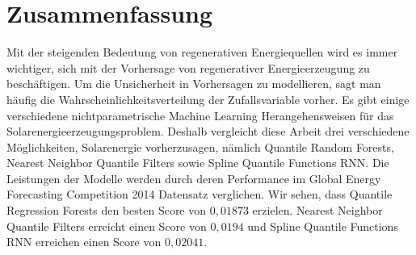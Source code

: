 
\chapter*{Zusammenfassung}

\begin{center}
  \begin{minipage}{12cm}
    \begin{sloppypar}
      Mit der steigenden Bedeutung von regenerativen Energiequellen wird es immer wichtiger, 
      sich mit der Vorhersage von regenerativer Energieerzeugung zu beschäftigen. 
      Um die Unsicherheit in Vorhersagen zu modellieren, sagt man häufig die Wahrscheinlichkeitsverteilung der 
      Zufallsvariable vorher. Es gibt einige verschiedene nichtparametrische Machine Learning Herangehensweisen 
      für das Solarenergieerzeugungsproblem. Deshalb vergleicht diese Arbeit drei verschiedene Möglichkeiten, Solarenergie 
      vorherzusagen, nämlich Quantile Random Forests, Nearest Neighbor Quantile Filters sowie Spline Quantile Functions RNN. 
      Die Leistungen der Modelle werden durch deren Performance im Global Energy Forecasting Competition 2014 Datensatz verglichen. 
      Wir sehen, dass Quantile Regression Forests den besten Score von \(0{,}01873\) erzielen. Nearest Neighbor Quantile Filters 
      erreicht einen Score von \(0{,}0194\) und Spline Quantile Functions RNN erreichen einen Score von \(0{,}02041\).
    \end{sloppypar}
  \end{minipage}
\end{center}